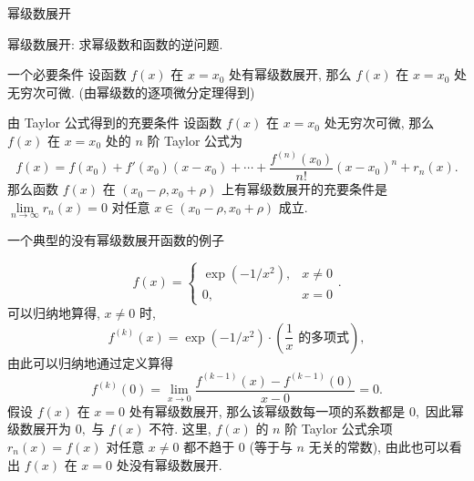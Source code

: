 \begin{frame}{幂级数展开}

幂级数展开: 求幂级数和函数的逆问题.

\pause

\begin{block}{一个必要条件}
设函数 $f(x)$ 在 $x = x_0$ 处有幂级数展开, 那么 $f(x)$ 在 $x = x_0$ 处无穷次可微. (由幂级数的逐项微分定理得到)
\end{block}

\pause

\begin{block}{由 Taylor 公式得到的充要条件}
设函数 $f(x)$ 在 $x = x_0$ 处无穷次可微, 那么 $f(x)$ 在 $x = x_0$ 处的 $n$ 阶 Taylor 公式为
\[f(x) = f(x_0) + f'(x_0)(x-x_0) + \cdots + \dfrac{f^{(n)}(x_0)}{n!} (x-x_0)^n + r_n(x).\]
那么函数 $f(x)$ 在 $(x_0 - \rho, x_0 + \rho)$ 上有幂级数展开的充要条件是 $\lim\limits_{n\to\infty} r_n(x) = 0$ 对任意 $x \in (x_0 - \rho, x_0 + \rho)$ 成立.
\end{block}

\end{frame}


\begin{frame}{一个典型的没有幂级数展开函数的例子}

\[f(x) = \begin{cases} \exp(-1/x^2), & x \neq 0 \\ 0, & x = 0 \end{cases}.\]
\pause
可以归纳地算得, $x \neq 0$ 时,
\[f^{(k)}(x) = \exp(-1/x^2) \cdot \left( \text{$\dfrac{1}{x}$ 的多项式} \right),\]
由此可以归纳地通过定义算得
\[f^{(k)}(0) = \lim\limits_{x\to 0} \dfrac{f^{(k-1)}(x) - f^{(k-1)}(0)}{x-0} = 0.\]
\pause
假设 $f(x)$ 在 $x = 0$ 处有幂级数展开, 那么该幂级数每一项的系数都是 $0,$ 因此幂级数展开为 $0,$ 与 $f(x)$ 不符.
\pause
这里, $f(x)$ 的 $n$ 阶 Taylor 公式余项 $r_n(x) = f(x)$ 对任意 $x \neq 0$ 都不趋于 $0$ (等于与 $n$ 无关的常数), 由此也可以看出 $f(x)$ 在 $x = 0$ 处没有幂级数展开.

\end{frame}


